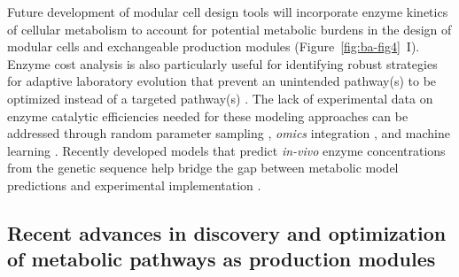 Future development of modular cell design tools will incorporate enzyme kinetics of cellular metabolism \citep{king2015, noor2016} to account for potential metabolic burdens \citep{wu2016} in the design of modular cells and exchangeable production modules (Figure~\ref{fig:ba-fig4}~I).
Enzyme cost analysis is also particularly useful for identifying robust strategies for adaptive laboratory evolution that prevent an unintended pathway(s) to be optimized instead of a targeted pathway(s) \citep{dinh2018}.
The lack of experimental data on enzyme catalytic efficiencies needed for these modeling approaches can be addressed through random parameter sampling \citep{dinh2018}, \emph{omics} integration \citep{ebrahim2016, khodayari2016}, and machine learning \citep{heckmann2018}.
Recently developed models that predict \emph{in-vivo} enzyme concentrations from the genetic sequence help bridge the gap between metabolic model predictions and experimental implementation \citep{farasat2014, meng2013, salis2009}.

\subsection{Recent advances in discovery and optimization of metabolic pathways as production modules}

